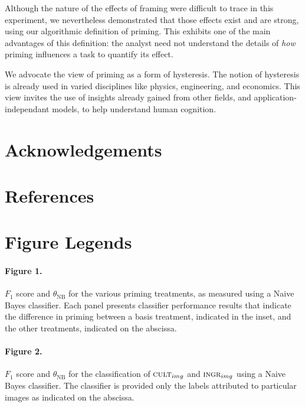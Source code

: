 \documentclass[a4paper]{report}
\begin{document}
Although the nature of the effects of framing were difficult to trace
in this experiment, we nevertheless demonstrated that those effects exist
and are strong, using our algorithmic definition of priming.  This exhibits
one of the main advantages of this definition: the analyst need 
not understand the details of \textit{how} priming influences a task to 
quantify its effect.

We advocate the view of priming as a form of hysteresis.  The notion of 
hysteresis is already used in varied disciplines like physics, engineering,
and economics.  This view invites the use of insights already gained from 
other fields, and application-independant models, to help understand human 
cognition.

\section*{Acknowledgements}
\section*{References}
\begingroup
\renewcommand{\chapter}[2]{}

\endgroup
 

\section*{Figure Legends}
\paragraph{Figure 1.}
$F_1$ score and $\theta_\text{NB}$ for the various 
priming treatments, as measured using a Naive Bayes classifier. Each panel 
presents classifier performance results that indicate the difference in
priming between a basis 
treatment, indicated in the inset, and the other treatments, indicated on the
abscissa.

\paragraph{Figure 2.}
$F_1$ score and $\theta_\text{NB}$ for the classification of 
$\textsc{cult}_{img}$ and $\textsc{ingr}_{img}$ using a Naive Bayes 
classifier.  The classifier is provided only the labels attributed to
particular images as indicated on the abscissa.
\end{document}
